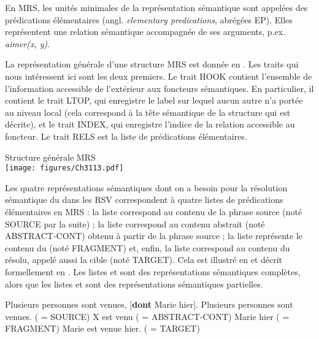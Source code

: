 En MRS, les unités minimales de la représentation sémantique sont appelées des prédications élémentaires (angl. \textit{elementary predications}, abrégées EP). Elles représentent une relation sémantique accompagnée de ses arguments, p.ex. \textit{aimer(x, y)}. 


  
La représentation générale d’une structure MRS est donnée en . Les traits qui nous intéressent ici sont les deux premiers. Le trait HOOK contient l’ensemble de l’information accessible de l’extérieur aux foncteurs sémantiques. En particulier, il contient le trait LTOP, qui enregistre le label sur lequel aucun autre n’a portée au niveau local (cela correspond à la tête sémantique de la structure qui est décrite), et le trait INDEX, qui enregistre l’indice de la relation accessible au foncteur. Le trait RELS est la liste de prédications élémentaires.

\newpage
\ea \label{ch3:ex113}
Structure générale MRS\\
\texttt{[image: figures/Ch3113.pdf]}
 
\z

\largerpage
Les quatre représentations sémantiques dont on a besoin pour la résolution sémantique du  dans les RSV correspondent à quatre listes de prédications élémentaires en MRS : la liste  correspond au contenu de la phrase source (noté SOURCE par la suite) ; la liste  correspond au contenu abstrait (noté ABSTRACT-CONT) obtenu à partir de la phrase source ; la liste  représente le contenu du  (noté FRAGMENT) et, enfin, la liste  correspond au contenu du  résolu, appelé aussi la cible (noté TARGET). Cela est illustré en  et décrit formellement en . Les listes  et  sont des représentations sémantiques complètes, alors que les listes  et  sont des représentations sémantiques partielles. 

\ea \label{ch3:ex114}
\ea 
Plusieurs personnes sont venues, [\textbf{dont} Marie hier]. \label{ch3:ex114a} 
\ex
Plusieurs personnes sont venues. ( = SOURCE) \label{ch3:ex114b} 
\ex 
X est venu ( = ABSTRACT-CONT) \label{ch3:ex114c}
\ex 
Marie hier ( = FRAGMENT) \label{ch3:ex114d}
\ex 
Marie est venue hier. ( = TARGET) \label{ch3:ex114e}
\z 
\z
 

